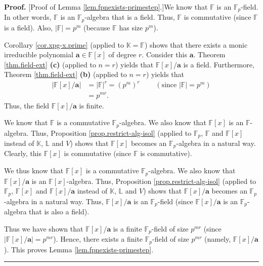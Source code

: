 \documentclass[numbers=enddot,12pt,final,onecolumn,notitlepage]{scrartcl}%
\theoremstyle{definition}
\newenvironment{proof}[1][Proof]{\noindent\textbf{#1.} }{\ \rule{0.5em}{0.5em}}
\begin{document}
\begin{proof}
[Proof of Lemma \ref{lem.fpnexists-primestep}.]We know that $\mathbb{F}$ is an
$\mathbb{F}_{p}$-field. In other words, $\mathbb{F}$ is an $\mathbb{F}_{p}%
$-algebra that is a field. Thus, $\mathbb{F}$ is commutative (since
$\mathbb{F}$ is a field). Also, $\left\vert \mathbb{F}\right\vert =p^{m}$
(because $\mathbb{F}$ has size $p^{m}$).

Corollary \ref{cor.xpg-x.prime} (applied to $\mathbb{K}=\mathbb{F}$) shows
that there exists a monic irreducible polynomial $\mathbf{a}\in\mathbb{F}%
\left[  x\right]  $ of degree $r$. Consider this $\mathbf{a}$. Theorem
\ref{thm.field-ext} \textbf{(c)} (applied to $n=r$) yields that $\mathbb{F}%
\left[  x\right]  /\mathbf{a}$ is a field. Furthermore, Theorem
\ref{thm.field-ext} \textbf{(b)} (applied to $n=r$) yields that
\begin{align*}
\left\vert \mathbb{F}\left[  x\right]  /\mathbf{a}\right\vert  &  =\left\vert
\mathbb{F}\right\vert ^{r}=\left(  p^{m}\right)  ^{r}%
\ \ \ \ \ \ \ \ \ \ \left(  \text{since }\left\vert \mathbb{F}\right\vert
=p^{m}\right) \\
&  =p^{mr}.
\end{align*}
Thus, the field $\mathbb{F}\left[  x\right]  /\mathbf{a}$ is finite.

We know that $\mathbb{F}$ is a commutative $\mathbb{F}_{p}$-algebra. We also
know that $\mathbb{F}\left[  x\right]  $ is an $\mathbb{F}$-algebra. Thus,
Proposition \ref{prop.restrict-alg-isol} (applied to $\mathbb{F}_{p}$,
$\mathbb{F}$ and $\mathbb{F}\left[  x\right]  $ instead of $\mathbb{K}$,
$\mathbb{L}$ and $V$) shows that $\mathbb{F}\left[  x\right]  $ becomes an
$\mathbb{F}_{p}$-algebra in a natural way. Clearly, this $\mathbb{F}\left[
x\right]  $ is commutative (since $\mathbb{F}$ is commutative).

We thus know that $\mathbb{F}\left[  x\right]  $ is a commutative
$\mathbb{F}_{p}$-algebra. We also know that $\mathbb{F}\left[  x\right]
/\mathbf{a}$ is an $\mathbb{F}\left[  x\right]  $-algebra. Thus, Proposition
\ref{prop.restrict-alg-isol} (applied to $\mathbb{F}_{p}$, $\mathbb{F}\left[
x\right]  $ and $\mathbb{F}\left[  x\right]  /\mathbf{a}$ instead of
$\mathbb{K}$, $\mathbb{L}$ and $V$) shows that $\mathbb{F}\left[  x\right]
/\mathbf{a}$ becomes an $\mathbb{F}_{p}$-algebra in a natural way. Thus,
$\mathbb{F}\left[  x\right]  /\mathbf{a}$ is an $\mathbb{F}_{p}$-field (since
$\mathbb{F}\left[  x\right]  /\mathbf{a}$ is an $\mathbb{F}_{p}$-algebra that
is also a field).

Thus we have shown that $\mathbb{F}\left[  x\right]  /\mathbf{a}$ is a finite
$\mathbb{F}_{p}$-field of size $p^{mr}$ (since $\left\vert \mathbb{F}\left[
x\right]  /\mathbf{a}\right\vert =p^{mr}$). Hence, there exists a finite
$\mathbb{F}_{p}$-field of size $p^{mr}$ (namely, $\mathbb{F}\left[  x\right]
/\mathbf{a}$). This proves Lemma \ref{lem.fpnexists-primestep}.
\end{proof}
\end{document}
